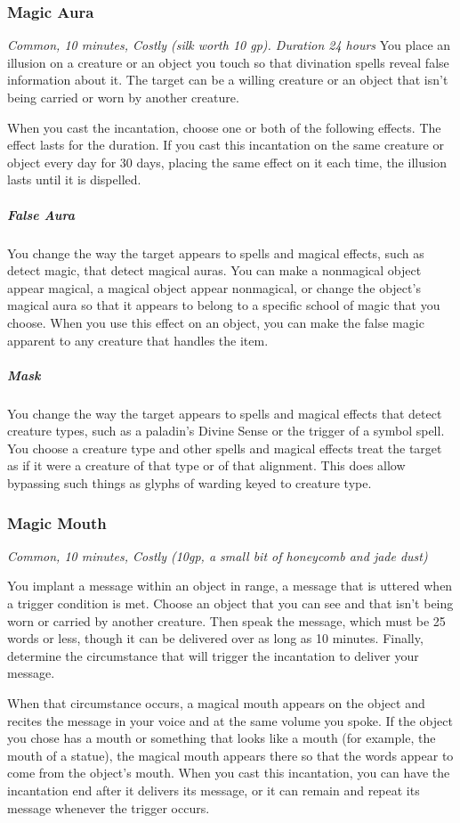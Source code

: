 \subsubsection{Magic Aura}
\textit{Common, 10 minutes, Costly (silk worth 10 gp). Duration 24 hours}
You place an illusion on a creature or an object you touch so that divination spells reveal false information about it. The target can be a willing creature or an object that isn't being carried or worn by another creature.

When you cast the incantation, choose one or both of the following effects. The effect lasts for the duration. If you cast this incantation on the same creature or object every day for 30 days, placing the same effect on it each time, the illusion lasts until it is dispelled.

\subparagraph*{False Aura} You change the way the target appears to spells and magical effects, such as detect magic, that detect magical auras. You can make a nonmagical object appear magical, a magical object appear nonmagical, or change the object's magical aura so that it appears to belong to a specific school of magic that you choose. When you use this effect on an object, you can make the false magic apparent to any creature that handles the item.

\subparagraph*{Mask} You change the way the target appears to spells and magical effects that detect creature types, such as a paladin's Divine Sense or the trigger of a symbol spell. You choose a creature type and other spells and magical effects treat the target as if it were a creature of that type or of that alignment. This does allow bypassing such things as glyphs of warding keyed to creature type.

\subsubsection{Magic Mouth}
\textit{Common, 10 minutes, Costly (10gp, a small bit of honeycomb and jade dust)}

You implant a message within an object in range, a message that is uttered when a trigger condition is met. Choose an object that you can see and that isn't being worn or carried by another creature. Then speak the message, which must be 25 words or less, though it can be delivered over as long as 10 minutes. Finally, determine the circumstance that will trigger the incantation to deliver your message.

When that circumstance occurs, a magical mouth appears on the object and recites the message in your voice and at the same volume you spoke. If the object you chose has a mouth or something that looks like a mouth (for example, the mouth of a statue), the magical mouth appears there so that the words appear to come from the object's mouth. When you cast this incantation, you can have the incantation end after it delivers its message, or it can remain and repeat its message whenever the trigger occurs.

